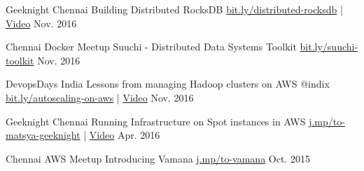 

\begin{cventries}

  \cventry
    {Geeknight Chennai} %
    {Building Distributed RocksDB} %
    {\href{http://bit.ly/distributed-rocksdb}{bit.ly/distributed-rocksdb} | \href{https://www.youtube.com/watch?v=PSCa9_Avne0}{Video}} %
    {Nov. 2016} %
    {
    }

  \cventry
    {Chennai Docker Meetup} %
    {Suuchi - Distributed Data Systems Toolkit} %
    {\href{http://bit.ly/suuchi-toolkit}{bit.ly/suuchi-toolkit}} %
    {Nov. 2016} %
    {
    }

  \cventry
    {DevopsDays India} %
    {Lessons from managing Hadoop clusters on AWS @indix} %
    {\href{http://bit.ly/autoscaling-on-aws}{bit.ly/autoscaling-on-aws} | \href{https://www.youtube.com/watch?v=eBbgylpRufQ}{Video}} %
    {Nov. 2016} %
    {
    }

  \cventry
    {Geeknight Chennai} %
    {Running Infrastructure on Spot instances in AWS} %
    {\href{http://j.mp/to-matsya-geeknight}{j.mp/to-matsya-geeknight} | \href{https://www.youtube.com/watch?v=qeBV9JRoTOA}{Video}} %
    {Apr. 2016} %
    {
    }

  \cventry
    {Chennai AWS Meetup} %
    {Introducing Vamana} %
    {\href{http://j.mp/to-vamana}{j.mp/to-vamana}} %
    {Oct. 2015} %
    {
    }

\end{cventries}
